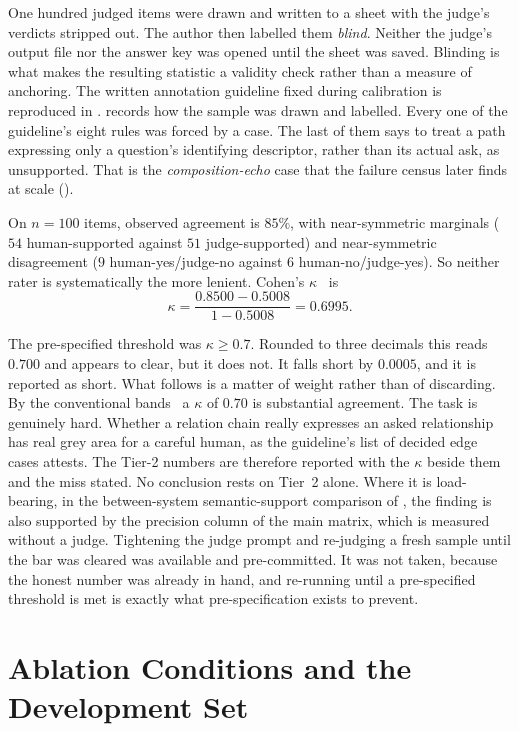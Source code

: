 One hundred judged items were drawn and written to a sheet with the judge's
verdicts stripped out. The author then labelled them \emph{blind}. Neither the
judge's output file nor the answer key was opened until the sheet was saved.
Blinding is what makes the resulting statistic a validity check rather than a
measure of anchoring. The written annotation guideline fixed during calibration
is reproduced in .  records how
the sample was drawn and labelled. Every one of the guideline's eight rules was
forced by a case. The last of them says to treat a path expressing only a
question's identifying descriptor, rather than its actual ask, as unsupported.
That is the \emph{composition-echo} case that the failure census later finds at
scale ().

On $n = 100$ items, observed agreement is $85\%$, with near-symmetric
marginals ($54$ human-supported against $51$
judge-supported) and near-symmetric disagreement ($9$ human-yes/judge-no against
$6$ human-no/judge-yes). So neither rater is systematically the more lenient.
Cohen's $\kappa$~\cite{cohen1960coefficient} is \[ \kappa = \frac{0.8500 -
0.5008}{1 - 0.5008} = 0.6995 . \]

The pre-specified threshold was $\kappa \geq 0.7$. Rounded to three decimals
this reads $0.700$ and appears to clear, but it does not. It falls short by
$0.0005$, and it is reported as short. What follows is a matter of weight rather
than of discarding. By the conventional bands~\cite{landis1977measurement} a
$\kappa$ of $0.70$ is substantial agreement. The task is genuinely hard. Whether
a relation chain really expresses an asked relationship has real grey area for a
careful human, as the guideline's list of decided edge cases attests. The Tier-2
numbers are therefore reported with the $\kappa$ beside them and the miss
stated. No conclusion rests on Tier~2 alone. Where it is load-bearing, in the
between-system semantic-support comparison of ,
the finding is also supported by the precision column of the main matrix, which
is measured without a judge. Tightening the judge prompt and re-judging a fresh
sample until the bar was cleared was available and pre-committed. It was not
taken, because the honest number was already in hand, and re-running until a
pre-specified threshold is met is exactly what pre-specification exists to
prevent.

\section{Ablation Conditions and the Development
Set}\label{sec:ablation-conditions}

